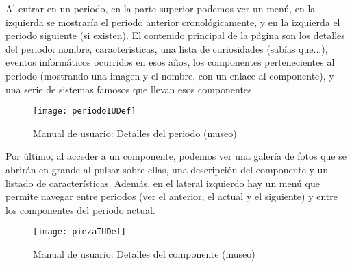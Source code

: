 Al entrar en un periodo, en la parte superior podemos ver un menú, en la izquierda se mostraría el periodo anterior cronológicamente, y en la izquierda el periodo siguiente (si existen). El contenido principal de la página son los detalles del periodo: nombre, características, una lista de curiosidades (sabías que...), eventos informáticos ocurridos en esos años, los componentes pertenecientes al periodo (mostrando una imagen y el nombre, con un enlace al componente), y una serie de sistemas famosos que llevan esos componentes. 
\begin{figure}[H]
\centering
\centerline{\texttt{[image: periodoIUDef]}}
\caption{Manual de usuario: Detalles del periodo (museo)}
\end{figure}
Por último, al acceder a un componente, podemos ver una galería de fotos que se abrirán en grande al pulsar sobre ellas, una descripción del componente y un listado de características. Además, en el lateral izquierdo hay un menú que permite navegar entre periodos (ver el anterior, el actual y el siguiente) y entre los componentes del periodo actual.
\begin{figure}[H]
\centering
\centerline{\texttt{[image: piezaIUDef]}}
\caption{Manual de usuario: Detalles del componente (museo)}
\end{figure}

